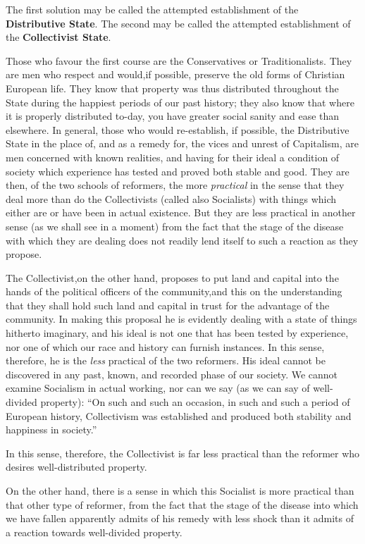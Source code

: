 \documentclass{book}
\newcommand\mdstrong[1]{\textbf{#1}}
\begin{document}
The first solution may be called the attempted establishment of the \mdstrong{Distributive State}. The second may be called the attempted establishment of the \mdstrong{Collectivist State}.

Those who favour the first course are the Conservatives or Traditionalists. They are men who respect and would,if possible, preserve the old forms of Christian European life. They know that property was thus distributed throughout the State during the happiest periods of our past history; they also know that where it is properly distributed to-day, you have greater social sanity and ease than elsewhere. In general, those who would re-establish, if possible, the Distributive State in the place of, and as a remedy for, the vices and unrest of Capitalism, are men concerned with known realities, and having for their ideal a condition of society which experience has tested and proved both stable and good. They are then, of the two schools of reformers, the more \emph{practical} in the sense that they deal more than do the Collectivists (called also Socialists) with things which either are or have been in actual existence. But they are less practical in another sense (as we shall see in a moment) from the fact that the stage of the disease with which they are dealing does not readily lend itself to such a reaction as they propose.

The Collectivist,on the other hand, proposes to put land and capital into the hands of the political officers of the community,and this on the understanding that they shall hold such land and capital in trust for the advantage of the community. In making this proposal he is evidently dealing with a state of things hitherto imaginary, and his ideal is not one that has been tested by experience, nor one of which our race and history can furnish instances. In this sense, therefore, he is the \emph{less} practical of the two reformers. His ideal cannot be discovered in any past, known, and recorded phase of our society. We cannot examine Socialism in actual working, nor can we say (as we can say of well-divided property): “On such and such an occasion, in such and such a period of European history, Collectivism was established and produced both stability and happiness in society.”

In this sense, therefore, the Collectivist is far less practical than the reformer who desires well-distributed property.

On the other hand, there is a sense in which this Socialist is more practical than that other type of reformer, from the fact that the stage of the disease into which we have fallen apparently admits of his remedy with less shock than it admits of a reaction towards well-divided property.
\end{document}
